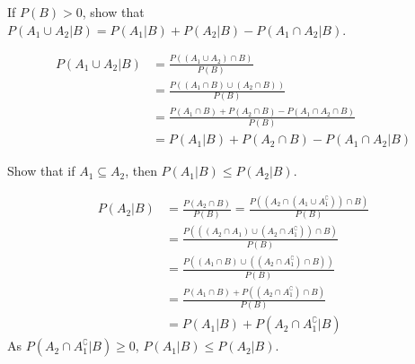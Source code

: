 \begin{example}
    If $P(B) > 0$, show that $P(A_1 \cup A_2 \vert B) = P(A_1 \vert B) + P(A_2
\vert B) - P(A_1 \cap A_2 \vert B)$.
\end{example}
\begin{solution}
    \begin{align*}
           P(A_1 \cup A_2 \vert B)
        &= \frac{P((A_1 \cup A_2) \cap B)}{P(B)}                             \\
        &= \frac{P((A_1 \cap B) \cup (A_2 \cap B))}{P(B)}                    \\
        &= \frac{P(A_1 \cap B) + P(A_2 \cap B) - P(A_1 \cap A_2 \cap B)}
                {P(B)}                                                       \\
        &= P(A_1 \vert B) + P(A_2 \cap B) - P(A_1 \cap A_2 \vert B)
    \end{align*}
\end{solution}

\begin{example}
    Show that if $A_1 \subseteq A_2$, then $P(A_1 \vert B) \leq P(A_2 \vert
B)$.
\end{example}
\begin{solution}
    \begin{align*}
           P(A_2 \vert B)
        &= \frac{P(A_2 \cap B)}{P(B)}
         = \frac{P((A_2 \cap (A_1 \cup A_1^\complement)) \cap B)}{P(B)}      \\
        &= \frac{P(((A_2 \cap A_1) \cup (A_2 \cap A_1^\complement)) \cap
           B)}{P(B)}                                                         \\
        &= \frac{P((A_1 \cap B) \cup ((A_2 \cap A_1^\complement) \cap B))}
           {P(B)}                                                            \\
        &= \frac{P(A_1 \cap B) + P((A_2 \cap A_1^\complement) \cap B)}{P(B)} \\
        &= P(A_1 \vert B) + P(A_2 \cap A_1^\complement \vert B)              
    \end{align*}
    As $P(A_2 \cap A_1^\complement \vert B) \geq 0$, $P(A_1 \vert B) \leq P(A_2
\vert B)$.
\end{solution}

